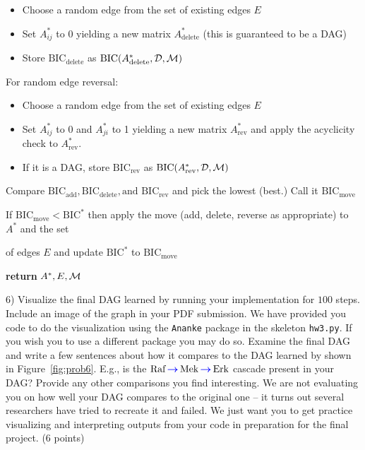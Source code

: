 \documentclass[letterpaper, 11pt]{article}
\DeclareMathOperator{\diedgeright}{\textcolor{blue}{\boldsymbol{\rightarrow}}}
\begin{document}
\begin{algorithm}[t]
\begin{algorithmic}[1]
		\begin{itemize}
			\item Choose a random edge from the set of existing edges $E$

			\item Set $A^*_{ij}$ to 0 yielding a new matrix $A_{\text{delete}}^*$ (this is guaranteed to be a DAG)

			\item Store $\text{BIC}_{\text{delete}}$ as $\text{BIC}(A_{\text{delete}}^*, {\cal D}, {\cal M})$
		\end{itemize}

		\State For random edge reversal:

		\begin{itemize}
			\item Choose a random edge from the set of existing edges $E$

			\item Set $A^*_{ij}$ to 0 and $A^*_{ji}$ to 1 yielding a new matrix $A_{\text{rev}}^*$ and apply the acyclicity check to $A_{\text{rev}}^*$.

			\item If it is a DAG, store $\text{BIC}_{\text{rev}}$ as $\text{BIC}(A_{\text{rev}}^*, {\cal D}, {\cal M})$
		\end{itemize}

		\vspace{0.5em}
		\State Compare $\text{BIC}_{\text{add}}, \text{BIC}_{\text{delete}}, \text{and } \text{BIC}_{\text{rev}}$ and pick the lowest (best.) Call it $\text{BIC}_{\text{move}}$

		\vspace{0.5em}
		\State If $\text{BIC}_{\text{move}} < \text{BIC}^*$ then apply the move (add, delete, reverse as appropriate) to $A^*$ and the set

		\hspace{-0.25cm} of edges $E$ and update $\text{BIC}^*$ to $\text{BIC}_{\text{move}}$
		\State

		\EndFor
		\vspace{0.5em}
		\State \textbf{return} $A^*, E, {\cal M}$
	\end{algorithmic}
\end{algorithm}

6) Visualize the final DAG learned by running your implementation for $100$ steps. Include an image of the graph in your PDF submission. We have provided you code to do the visualization using the \texttt{Ananke} package in the skeleton \texttt{hw3.py}. If you wish you to use a different package you may do so. Examine the final DAG and write a few sentences about how it compares to the DAG learned by \cite{sachs2005causal} shown in Figure~\ref{fig:prob6}.  E.g., is the $\text{Raf} \diedgeright \text{Mek} \diedgeright \text{Erk}$ cascade present in your DAG? Provide any other comparisons you find interesting. We are not evaluating you on how well your DAG compares to the original one -- it turns out several researchers have tried to recreate it and failed. We just want you to get practice visualizing and interpreting outputs from your code in preparation for the final project. (6 points)
\end{document}
